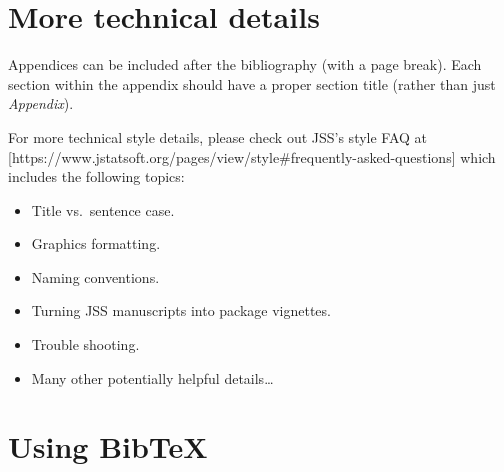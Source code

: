 \documentclass[
  nojss,
  article]{jss}
\providecommand{\tightlist}{%
  \setlength{\itemsep}{0pt}\setlength{\parskip}{0pt}}
\begin{document}
\renewcommand{\bibsection}{}


\newpage{}

\section*{More technical details}\label{sec-techdetails}

\begin{tcolorbox}[enhanced jigsaw, bottomrule=.15mm, breakable, toprule=.15mm, opacityback=0, colframe=quarto-callout-color-frame, left=2mm, rightrule=.15mm, arc=.35mm, leftrule=.75mm, colback=white]

Appendices can be included after the bibliography (with a page break).
Each section within the appendix should have a proper section title
(rather than just \emph{Appendix}).

For more technical style details, please check out JSS's style FAQ at
{[}https://www.jstatsoft.org/pages/view/style\#frequently-asked-questions{]}
which includes the following topics:

\begin{itemize}
\tightlist
\item
  Title vs.~sentence case.
\item
  Graphics formatting.
\item
  Naming conventions.
\item
  Turning JSS manuscripts into  package vignettes.
\item
  Trouble shooting.
\item
  Many other potentially helpful details\ldots{}
\end{itemize}

\end{tcolorbox}

\section*{Using BibTeX}\label{sec-bibtex}
\end{document}
